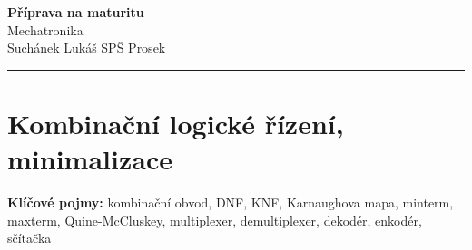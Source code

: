 \documentclass[a4paper,10pt]{article}
\begin{document}
\begin{minipage}[t]{0.75\textwidth}
    {\Huge\bfseries\color{accent} Příprava na maturitu}\\[4pt]
    {\large\color{stripeblue} Mechatronika}\\[2pt]
    \textcolor{medgray}{\small Suchánek Lukáš \quad SPŠ Prosek }
\end{minipage}
\hfill
\begin{minipage}[t]{0.22\textwidth}
    \raggedleft
\end{minipage}

\vspace{6pt}
\noindent\color{accent}\rule{\linewidth}{1.5pt}
\vspace{2pt}

\section{Kombinační logické řízení, minimalizace}

\begin{pojmybox}
\textbf{Klíčové pojmy:}
kombinační obvod, DNF, KNF, Karnaughova mapa, minterm, maxterm,
Quine-McCluskey, multiplexer, demultiplexer, dekodér, enkodér, sčítačka
\end{pojmybox}
\end{document}
